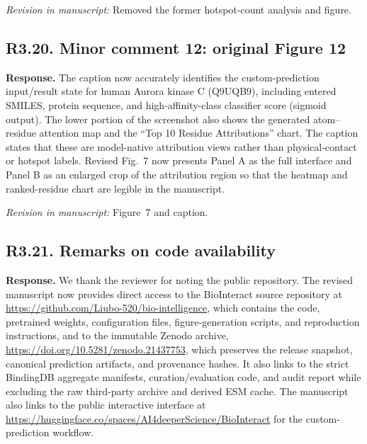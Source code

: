 \documentclass[11pt,a4paper]{article}
\newcommand{\response}{\noindent\textbf{Response.} }
\newcommand{\change}[1]{\par\smallskip\noindent\textit{Revision in manuscript:} #1\par\medskip}
\begin{document}
\change{Removed the former hotspot-count analysis and figure.}

\subsection*{R3.20. Minor comment 12: original Figure 12}


\response The caption now accurately identifies the custom-prediction
input/result state for human Aurora kinase C (Q9UQB9), including entered
SMILES, protein sequence, and high-affinity-class classifier score (sigmoid
output).  The lower portion of the screenshot also shows the generated
atom--residue attention map and the ``Top 10 Residue Attributions'' chart.  The
caption states that these are model-native attribution views rather than
physical-contact or hotspot labels. Revised Fig.~7 now presents Panel A as the
full interface and Panel B as an enlarged crop of the attribution region so that
the heatmap and ranked-residue chart are legible in the manuscript.

\change{Figure~7 and caption.}

\subsection*{R3.21. Remarks on code availability}


\response We thank the reviewer for noting the public repository. The revised
manuscript now provides direct access to the BioInteract source repository at
\url{https://github.com/Liubo-520/bio-intelligence}, which contains the code,
pretrained weights, configuration files, figure-generation scripts, and
reproduction instructions, and to the immutable Zenodo archive,
\url{https://doi.org/10.5281/zenodo.21437753}, which preserves the release
snapshot, canonical prediction artifacts, and provenance hashes. It also links
to the strict BindingDB aggregate manifests, curation/evaluation code, and audit
report while excluding the raw third-party archive and derived ESM cache. The manuscript also links
to the public interactive interface at
\url{https://huggingface.co/spaces/AI4deeperScience/BioInteract} for the
custom-prediction workflow.
\end{document}
